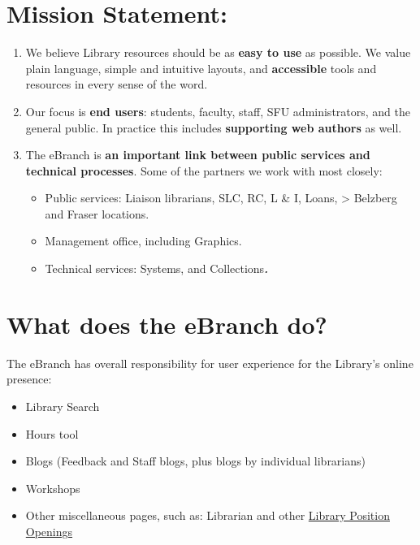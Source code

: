 \documentclass[
  openany]{book}
\providecommand{\tightlist}{%
  \setlength{\itemsep}{0pt}\setlength{\parskip}{0pt}}
\begin{document}
\hypertarget{mission-statement}{%
\section{Mission Statement:}\label{mission-statement}}

\begin{enumerate}
\def\labelenumi{\Alph{enumi}.}
\item
  We believe Library resources should be as \textbf{easy to use} as possible. We value plain language, simple and intuitive layouts, and \textbf{accessible} tools and resources in every sense of the word.
\item
  Our focus is \textbf{end users}: students, faculty, staff, SFU administrators, and the general public. In practice this includes \textbf{supporting web authors} as well.
\item
  The eBranch is \textbf{an important link between public services and technical processes}. Some of the partners we work with most closely:

  \begin{itemize}
  \item
    Public services: Liaison librarians, SLC, RC, L \& I, Loans,
    \textgreater{} Belzberg and Fraser locations.
  \item
    Management office, including Graphics.
  \item
    Technical services: Systems, and Collections\textbf{\emph{.}}
  \end{itemize}
\end{enumerate}

\hypertarget{what-does-the-ebranch-do}{%
\section{What does the eBranch do?}\label{what-does-the-ebranch-do}}

The eBranch has overall responsibility for user experience for the
Library's online presence:

\begin{itemize}
\tightlist
\item
  Library Search
\item
  Hours tool
\item
  Blogs (Feedback and Staff blogs, plus blogs by individual librarians)
\item
  Workshops
\item
  Other miscellaneous pages, such as: Librarian and other \href{https://www.lib.sfu.ca/about/overview/employment/librarian-jobs}{Library Position Openings}
\end{itemize}
\end{document}

